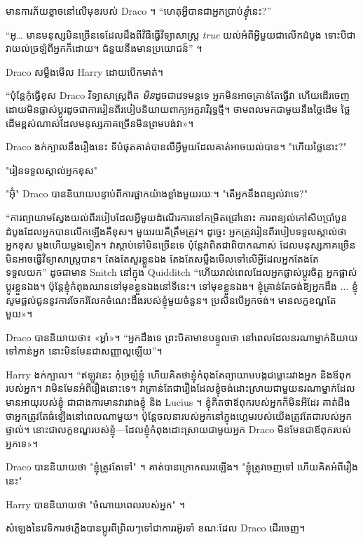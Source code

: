 មានការភ័យខ្លាចនៅលើមុខរបស់ Draco ។ “ហេតុអ្វីបានជាអ្នកប្រាប់\emph{ខ្ញុំ}នេះ?”

“អូ… មាន​មនុស្ស​មិន​ច្រើន​ទេ​ដែល​ដឹង​ពី​វិធី​ធ្វើ​វិទ្យាសាស្ត្រ \emph{true} យល់​អំពី​អ្វី​មួយ​ជា​លើក​ដំបូង ទោះ​បី​ជា​វា​យល់​ច្រឡំ​ពី​អ្នក​ក៏​ដោយ។ ជំនួយនឹងមានប្រយោជន៍” ។

Draco សម្លឹងមើល Harry ដោយបើកមាត់។

“ប៉ុន្តែកុំធ្វើខុស Draco វិទ្យាសាស្រ្តពិត \emph{មិន}ដូចជាវេទមន្តទេ អ្នកមិនអាចគ្រាន់តែធ្វើវា ហើយដើរចេញដោយមិនផ្លាស់ប្តូរដូចជាការរៀនពីរបៀបនិយាយពាក្យអក្ខរាវិរុទ្ធថ្មី។ ថាមពល​មក​ជាមួយ​នឹង​ថ្លៃ​ដើម ថ្លៃ​ដើម​ខ្ពស់​ណាស់​ដែល​មនុស្ស​ភាគ​ច្រើន​មិន​ព្រម​បង់​វា»។

Draco ងក់ក្បាលនឹងរឿងនេះ ទីបំផុតគាត់បានលឺអ្វីមួយដែលគាត់អាចយល់បាន។ "ហើយថ្លៃនោះ?"

"រៀនទទួលស្គាល់អ្នកខុស"

"អ៊ុំ" Draco បាននិយាយបន្ទាប់ពីការផ្អាកយ៉ាងខ្លាំងមួយរយៈ។ "តើអ្នកនឹងពន្យល់វាទេ?"

“ការព្យាយាមស្វែងយល់ពីរបៀបដែលអ្វីមួយដំណើរការនៅកម្រិតជ្រៅនោះ ការពន្យល់កៅសិបប្រាំបួនដំបូងដែលអ្នកបានលើកឡើងគឺខុស។ មួយរយគឺត្រឹមត្រូវ។ ដូច្នេះ អ្នកត្រូវរៀនពីរបៀបទទួលស្គាល់ថាអ្នកខុស ម្តងហើយម្តងទៀត។ វាស្តាប់ទៅមិនច្រើនទេ ប៉ុន្តែវាពិតជាពិបាកណាស់ ដែលមនុស្សភាគច្រើនមិនអាចធ្វើវិទ្យាសាស្ត្របាន។ តែងតែសួរខ្លួនឯង តែងតែសម្លឹងមើលទៅលើអ្វីដែលអ្នកតែងតែទទួលយក” ដូចជាមាន Snitch នៅក្នុង Quidditch “ហើយរាល់ពេលដែលអ្នកផ្លាស់ប្តូរចិត្ត អ្នកផ្លាស់ប្តូរខ្លួនឯង។ ប៉ុន្តែ​ខ្ញុំ​កំពុង​ឈាន​ទៅ​មុខ​ខ្លួន​ឯង​នៅ​ទីនេះ។ ទៅមុខខ្លួនឯង។ ខ្ញុំ​គ្រាន់​តែ​ចង់​ឱ្យ​អ្នក​ដឹង ... ខ្ញុំ​សូម​ផ្តល់​ជូន​នូវ​ការ​ចែក​រំលែក​ចំណេះ​ដឹង​របស់​ខ្ញុំ​មួយ​ចំនួន​។ ប្រសិនបើអ្នកចង់។ មាន​លក្ខខណ្ឌ​តែ​មួយ»។

Draco បាន​និយាយ​ថា​៖ ​«​អ្ហា៎​»។ “អ្នកដឹងទេ ព្រះបិតាមានបន្ទូលថា នៅពេលដែលនរណាម្នាក់និយាយទៅកាន់អ្នក នោះមិនមែនជាសញ្ញាល្អឡើយ”។

Harry ងក់ក្បាល។ “ឥឡូវ​នេះ កុំ​ច្រឡំ​ខ្ញុំ ហើយ​គិត​ថា​ខ្ញុំ​កំពុង​តែ​ព្យាយាម​បង្ក​ជម្លោះ​រវាង​អ្នក និង​ឪពុក​របស់​អ្នក។ វាមិនមែនអំពីរឿងនោះទេ។ វាគ្រាន់តែជារឿងដែលខ្ញុំចង់ដោះស្រាយជាមួយនរណាម្នាក់ដែលមានអាយុរបស់ខ្ញុំ ជាជាងការមានវារវាងខ្ញុំ និង Lucius ។ ខ្ញុំ​គិត​ថា​ឪពុក​របស់​អ្នក​ក៏​មិន​អី​ដែរ គាត់​ដឹង​ថា​អ្នក​ត្រូវ​តែ​ធំ​ឡើង​នៅ​ពេល​ណា​មួយ។ ប៉ុន្តែចលនារបស់អ្នកនៅក្នុងហ្គេមរបស់យើងត្រូវតែជារបស់អ្នកផ្ទាល់។ នោះ​ជា​លក្ខខណ្ឌ​របស់​ខ្ញុំ—ដែល​ខ្ញុំ​កំពុង​ដោះស្រាយ​ជាមួយ​អ្នក Draco មិន​មែន​ជា​ឪពុក​របស់​អ្នក​ទេ»។

Draco បាននិយាយថា "ខ្ញុំត្រូវតែទៅ" ។ គាត់បានក្រោកឈរឡើង។ "ខ្ញុំត្រូវចេញទៅ ហើយគិតអំពីរឿងនេះ"

Harry បាននិយាយថា "ចំណាយពេលរបស់អ្នក" ។

សំឡេង​នៃ​វេទិកា​រថភ្លើង​បាន​ប្តូរ​ពី​ព្រិលៗ​ទៅ​ជា​ការ​រអ៊ូរទាំ ខណៈ​ដែល Draco ដើរ​ចេញ។

